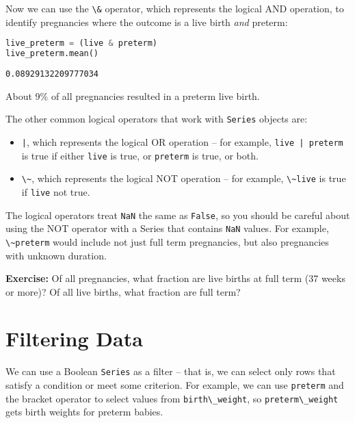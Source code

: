 \pagebreak

Now we can use the \passthrough{\lstinline!\&!} operator, which
represents the logical AND operation, to identify pregnancies where the
outcome is a live birth \emph{and} preterm:


\begin{lstlisting}[language=Python,style=source]
live_preterm = (live & preterm)
live_preterm.mean()
\end{lstlisting}

\begin{lstlisting}[style=output]
0.08929132209777034
\end{lstlisting}

About 9\% of all pregnancies resulted in a preterm live birth.

The other common logical operators that work with
\passthrough{\lstinline!Series!} objects are:

\begin{itemize}
\item
  \passthrough{\lstinline!|!}, which represents the logical OR operation
  -- for example, \passthrough{\lstinline!live | preterm!} is true if
  either \passthrough{\lstinline!live!} is true, or
  \passthrough{\lstinline!preterm!} is true, or both.
\item
  \passthrough{\lstinline!\~!}, which represents the logical NOT
  operation -- for example, \passthrough{\lstinline!\~live!} is true if
  \passthrough{\lstinline!live!} not true.
\end{itemize}

The logical operators treat \passthrough{\lstinline!NaN!} the same as
\passthrough{\lstinline!False!}, so you should be careful about using
the NOT operator with a Series that contains
\passthrough{\lstinline!NaN!} values. For example,
\passthrough{\lstinline!\~preterm!} would include not just full term
pregnancies, but also pregnancies with unknown duration.

\textbf{Exercise:} Of all pregnancies, what fraction are live births at
full term (37 weeks or more)? Of all live births, what fraction are full
term?

\section{Filtering Data}\label{filtering-data}

We can use a Boolean \passthrough{\lstinline!Series!} as a filter --
that is, we can select only rows that satisfy a condition or meet some
criterion. For example, we can use \passthrough{\lstinline!preterm!} and
the bracket operator to select values from
\passthrough{\lstinline!birth\_weight!}, so
\passthrough{\lstinline!preterm\_weight!} gets birth weights for preterm
babies.

